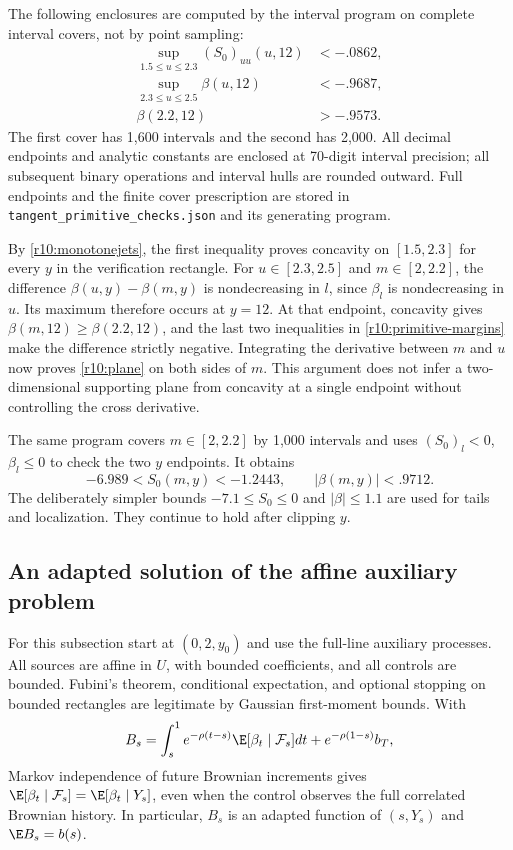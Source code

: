 The following enclosures are computed by the interval program on complete interval covers, not by point sampling:
\begin{align}
 \sup_{1.5\leq u\leq2.3}(S_0)_{uu}(u,12)&<- .0862,\\
 \sup_{2.3\leq u\leq2.5}\beta(u,12)&<- .9687,\\
 \beta(2.2,12)&>- .9573.\label{r10:primitive-margins}
\end{align}
The first cover has 1,600 intervals and the second has 2,000. All decimal endpoints and analytic constants are enclosed at 70-digit interval precision; all subsequent binary operations and interval hulls are rounded outward. Full endpoints and the finite cover prescription are stored in \texttt{tangent\_primitive\_checks.json} and its generating program.

By \eqref{r10:monotonejets}, the first inequality proves concavity on $[1.5,2.3]$ for every $y$ in the verification rectangle. For $u\in[2.3,2.5]$ and $m\in[2,2.2]$, the difference $\beta(u,y)-\beta(m,y)$ is nondecreasing in $l$, since $\beta_l$ is nondecreasing in $u$. Its maximum therefore occurs at $y=12$. At that endpoint, concavity gives $\beta(m,12)\geq\beta(2.2,12)$, and the last two inequalities in \eqref{r10:primitive-margins} make the difference strictly negative. Integrating the derivative between $m$ and $u$ now proves \eqref{r10:plane} on both sides of $m$. This argument does not infer a two-dimensional supporting plane from concavity at a single endpoint without controlling the cross derivative.

The same program covers $m\in[2,2.2]$ by 1,000 intervals and uses $(S_0)_l<0$, $\beta_l\leq0$ to check the two $y$ endpoints. It obtains
\begin{equation}
 -6.989<S_0(m,y)<-1.2443,\qquad |\beta(m,y)|<.9712.\label{r10:source-bounds}
\end{equation}
The deliberately simpler bounds $-7.1\leq S_0\leq0$ and $|\beta|\leq1.1$ are used for tails and localization. They continue to hold after clipping $y$.

\subsection{An adapted solution of the affine auxiliary problem}
For this subsection start at $(0,2,y_0)$ and use the full-line auxiliary processes. All sources are affine in $U$, with bounded coefficients, and all controls are bounded. Fubini's theorem, conditional expectation, and optional stopping on bounded rectangles are legitimate by Gaussian first-moment bounds. With
\[
 B_s=\int_s^1e^{-\rho(t-s)}\E[\beta_t\mid\mathcal F_s]dt
                  +e^{-\rho(1-s)}b_T,
\]
Markov independence of future Brownian increments gives
$\E[\beta_t\mid\mathcal F_s]=\E[\beta_t\mid Y_s]$, even when the control observes the full correlated Brownian history. In particular, $B_s$ is an adapted function of $(s,Y_s)$ and $\E B_s=b(s)$.

